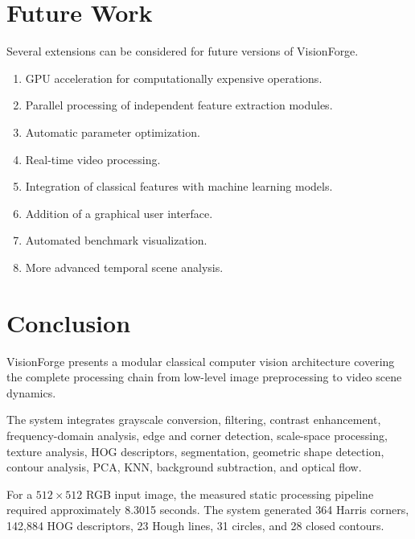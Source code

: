 \documentclass[11pt,a4paper]{article}
\begin{document}

\section{Future Work}

Several extensions can be considered for future versions of VisionForge.

\begin{enumerate}
    \item GPU acceleration for computationally expensive operations.
    \item Parallel processing of independent feature extraction modules.
    \item Automatic parameter optimization.
    \item Real-time video processing.
    \item Integration of classical features with machine learning models.
    \item Addition of a graphical user interface.
    \item Automated benchmark visualization.
    \item More advanced temporal scene analysis.
\end{enumerate}


\section{Conclusion}

VisionForge presents a modular classical computer vision architecture covering the complete processing chain from low-level image preprocessing to video scene dynamics.

The system integrates grayscale conversion, filtering, contrast enhancement, frequency-domain analysis, edge and corner detection, scale-space processing, texture analysis, HOG descriptors, segmentation, geometric shape detection, contour analysis, PCA, KNN, background subtraction, and optical flow.

For a $512\times512$ RGB input image, the measured static processing pipeline required approximately 8.3015 seconds. The system generated 364 Harris corners, 142,884 HOG descriptors, 23 Hough lines, 31 circles, and 28 closed contours.
\end{document}
